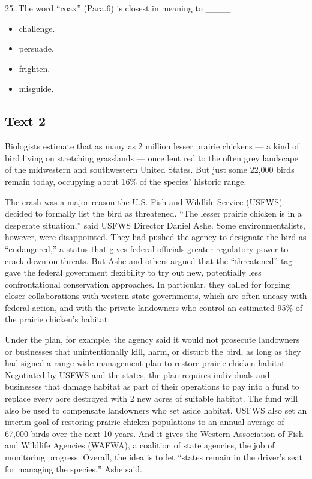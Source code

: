 \documentclass[UTF8,11pt]{ctexart}
\begin{document}
25. The word “coax” (Para.6) is closest in meaning to \_\_\_\_


\begin{itemize}[leftmargin=2em,itemsep=.2em,topsep=.4em]\item[A.] challenge.
\item[B.] persuade.
\item[C.] frighten.
\item[D.] misguide.
\end{itemize}

\subsection*{\textbf{Text 2}}


Biologists estimate that as many as 2 million lesser prairie chickens — a kind of bird living on stretching grasslands — once lent red to the often grey landscape of the midwestern and southwestern United States. But just some 22,000 birds remain today, occupying about 16\% of the species’ historic range.


The crash was a major reason the U.S. Fish and Wildlife Service (USFWS) decided to formally list the bird as threatened. “The lesser prairie chicken is in a desperate situation,” said USFWS Director Daniel Ashe. Some environmentalists, however, were disappointed. They had pushed the agency to designate the bird as “endangered,” a status that gives federal officials greater regulatory power to crack down on threats. But Ashe and others argued that the “threatened” tag gave the federal government flexibility to try out new, potentially less confrontational conservation approaches. In particular, they called for forging closer collaborations with western state governments, which are often uneasy with federal action, and with the private landowners who control an estimated 95\% of the prairie chicken’s habitat.


Under the plan, for example, the agency said it would not prosecute landowners or businesses that unintentionally kill, harm, or disturb the bird, as long as they had signed a range-wide management plan to restore prairie chicken habitat. Negotiated by USFWS and the states, the plan requires individuals and businesses that damage habitat as part of their operations to pay into a fund to replace every acre destroyed with 2 new acres of suitable habitat. The fund will also be used to compensate landowners who set aside habitat. USFWS also set an interim goal of restoring prairie chicken populations to an annual average of 67,000 birds over the next 10 years. And it gives the Western Association of Fish and Wildlife Agencies (WAFWA), a coalition of state agencies, the job of monitoring progress. Overall, the idea is to let “states remain in the driver’s seat for managing the species,” Ashe said.
\end{document}
